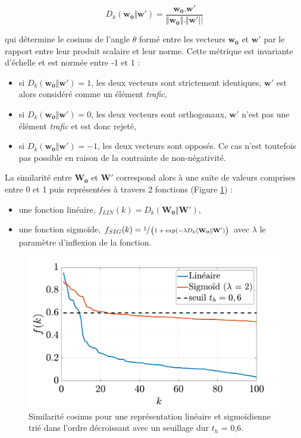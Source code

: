 \begin{equation}\label{eq:similarite_cosinus}
 D_{k}(\mathbf{w_0}\Vert\mathbf{w'}) = \frac{\mathbf{w_0}.\mathbf{w'}}{\Vert\mathbf{w_0}  \Vert. \Vert\mathbf{w'} \vert \vert}
\end{equation}

qui détermine le cosinus de l'angle $\theta$ formé entre les vecteurs $\mathbf{w_0}$ et $\mathbf{w'}$ par le rapport entre leur produit scalaire et leur norme. Cette métrique est invariante d'échelle et est normée entre -1 et 1 : 

\begin{itemize}
\item si $D_{k}(\mathbf{w_0}\Vert\mathbf{w'}) = 1$, les deux vecteurs sont strictement identiques, $\mathbf{w'}$ est alors considéré comme un élément \textit{trafic}, 
\item si $D_{k}(\mathbf{w_0}\Vert\mathbf{w'}) = 0$, les deux vecteurs sont orthogonaux, $\mathbf{w'}$ n'est pas une élément \textit{trafic} et est donc rejeté,
\item si $D_{k}(\mathbf{w_0}\Vert\mathbf{w'}) = -1$, les deux vecteurs sont opposés. Ce cas n'est toutefois pas possible en raison de la contrainte de non-négativité.\\
\end{itemize}

La similarité entre $\mathbf{W_0}$ et $\mathbf{W'}$ correspond alors à une suite de valeurs comprises entre 0 et 1 puis représentées à travers 2 fonctions (Figure \ref{fig:resume_simil}) : 

\begin{itemize}
\item une fonction linéaire, $f_{LIN}(k) = D_{k}(\mathbf{W_0} \Vert \mathbf{W'})$,  
\item une fonction sigmoïde, $f_{SIG}(k) = \sfrac{1}{\left(1+\exp({-\lambda D_{k}(\mathbf{W_0} \Vert \mathbf{W'})}\right)}$ avec $\lambda$ le paramètre d'inflexion de la fonction.\\
\end{itemize}

\begin{figure}
    \centering
    \includegraphics[width=0.7\linewidth]{./figures/NMF/lin_sig.pdf}
    \caption{Similarité cosinus pour une représentation linéaire et sigmoïdienne trié dans l'ordre décroissant avec un seuillage dur $t_h$ = 0,6.}
    \label{fig:resume_simil}
\end{figure}

